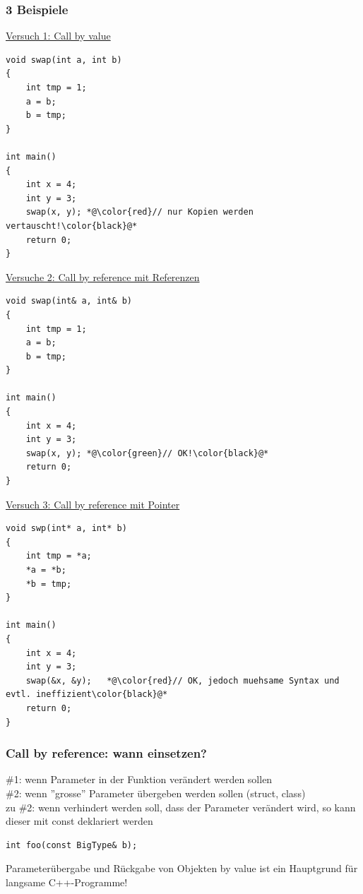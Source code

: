\subsubsection{3 Beispiele}
\label{sec:3 Beispiele}
\underline{Versuch 1: Call by value}
\noindent
\begin{minipage}{\linewidth}
\begin{lstlisting}
void swap(int a, int b)
{
	int tmp = 1;
	a = b;
	b = tmp;
}

int main()
{
	int x = 4;
	int y = 3;
	swap(x, y);	*@\color{red}// nur Kopien werden vertauscht!\color{black}@*
	return 0;
}
\end{lstlisting}
\end{minipage}
\underline{Versuche 2: Call by reference mit Referenzen}
\noindent
\begin{minipage}{\linewidth}
\begin{lstlisting}
void swap(int& a, int& b)
{
	int tmp = 1;
	a = b;
	b = tmp;
}

int main()
{
	int x = 4;
	int y = 3;
	swap(x, y);	*@\color{green}// OK!\color{black}@*
	return 0;
}
\end{lstlisting}
\end{minipage}
\underline{Versuch 3: Call by reference mit Pointer}
\noindent
\begin{minipage}{\linewidth}
\begin{lstlisting}
void swp(int* a, int* b)
{
	int tmp = *a;
	*a = *b;
	*b = tmp;
}

int main()
{
	int x = 4;
	int y = 3;
	swap(&x, &y);	*@\color{red}// OK, jedoch muehsame Syntax und evtl. ineffizient\color{black}@*
	return 0;
}
\end{lstlisting}
\end{minipage}

\subsubsection{Call by reference: wann einsetzen?}
\label{sec:Call by reference: wann einsetzen?}
\#1: wenn Parameter in der Funktion verändert werden sollen\\
\#2: wenn ''grosse'' Parameter übergeben werden sollen (struct, class)\\
zu \#2: wenn verhindert werden soll, dass der Parameter verändert wird, so kann dieser mit const deklariert werden\\
\noindent
\begin{minipage}{\linewidth}
\begin{lstlisting}
int foo(const BigType& b);
\end{lstlisting}
\end{minipage}
\begin{achtung}
Parameterübergabe und Rückgabe von Objekten by value ist ein Hauptgrund für langsame C++-Programme!
\end{achtung}

